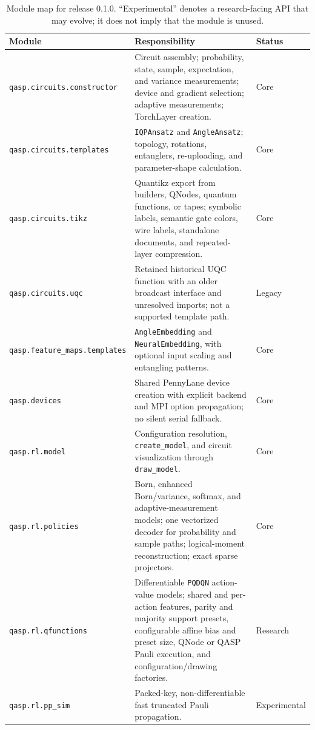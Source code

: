 \documentclass[10pt]{article}
\renewcommand{\arraystretch}{1.15}
\newcommand{\code}[1]{\texttt{#1}}
\newcommand{\version}{0.1.0}
\begin{document}
\begin{table}[p]
\centering
\caption{Module map for release \version{}.  ``Experimental'' denotes a research-facing API that may evolve; it does not imply that the module is unused.}
\label{tab:modules}
\scriptsize
\renewcommand{\arraystretch}{1.06}
\begin{tabularx}{\textwidth}{@{}p{}X>{\raggedright\arraybackslash}p{}@{}}
\toprule
Module & Responsibility & Status \\
\midrule
\code{qasp.circuits.constructor} & Circuit assembly; probability, state, sample, expectation, and variance measurements; device and gradient selection; adaptive measurements; TorchLayer creation. & Core \\
\code{qasp.circuits.templates} & \code{IQPAnsatz} and \code{AngleAnsatz}; topology, rotations, entanglers, re-uploading, and parameter-shape calculation. & Core \\
\code{qasp.circuits.tikz} & Quantikz export from builders, QNodes, quantum functions, or tapes; symbolic labels, semantic gate colors, wire labels, standalone documents, and repeated-layer compression. & Core \\
\code{qasp.circuits.uqc} & Retained historical UQC function with an older broadcast interface and unresolved imports; not a supported template path. & Legacy \\
\code{qasp.feature\_maps.templates} & \code{AngleEmbedding} and \code{NeuralEmbedding}, with optional input scaling and entangling patterns. & Core \\
\code{qasp.devices} & Shared PennyLane device creation with explicit backend and MPI option propagation; no silent serial fallback. & Core \\
\code{qasp.rl.model} & Configuration resolution, \code{create\_model}, and circuit visualization through \code{draw\_model}. & Core \\
\code{qasp.rl.policies} & Born, enhanced Born/variance, softmax, and adaptive-measurement models; one vectorized decoder for probability and sample paths; logical-moment reconstruction; exact sparse projectors. & Core \\
\code{qasp.rl.qfunctions} & Differentiable \code{PQDQN} action-value models; shared and per-action features, parity and majority support presets, configurable affine bias and preset size, QNode or QASP Pauli execution, and configuration/drawing factories. & Research \\
\code{qasp.rl.pp\_sim} & Packed-key, non-differentiable fast truncated Pauli propagation. & Experimental \\

\end{tabularx}
\end{table}
\end{document}
